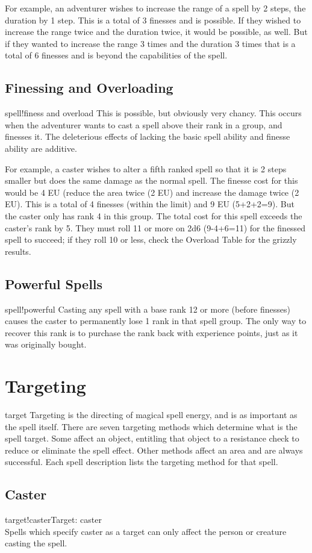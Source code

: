 For example, an adventurer wishes to increase the range of a spell by 2 steps, the duration by 1 step. This is a total of 3 finesses and is possible. If they wished to increase the range twice and the duration twice, it would be possible, as well. But if they wanted to increase the range 3 times and the duration 3 times that is a total of 6 finesses and is beyond the capabilities of the spell.
\subsection{Finessing and Overloading}
spell!finess and overload
This is possible, but obviously very chancy. This occurs when the adventurer wants to cast a spell above their rank in a group, and finesses it. The deleterious effects of lacking the basic spell ability and finesse ability are additive.

For example, a caster wishes to alter a fifth ranked spell so that it is 2 steps smaller but does the same damage as the normal spell. The finesse cost for this would be 4 EU (reduce the area twice (2 EU) and increase the damage twice (2 EU). This is a total of 4 finesses (within the limit) and 9 EU (5+2+2=9). But the caster only has rank 4 in this group. The total cost for this spell exceeds the caster's rank by 5. They must roll 11 or more on 2d6 (9-4+6=11) for the finessed spell to succeed; if they roll 10 or less, check the Overload Table for the grizzly results.
\subsection{Powerful Spells}
spell!powerful
Casting any spell with a base rank 12 or more (before finesses) causes the caster to permanently lose 1 rank in that spell group. The only way to recover this rank is to purchase the rank back with experience points, just as it was originally bought.
\section{Targeting}
target
Targeting is the directing of magical spell energy, and is as important as the spell itself. There are seven targeting methods which determine what is the spell target. Some affect an object, entitling that object to a resistance check to reduce or eliminate the spell effect. Other methods affect an area and are always successful. Each spell description lists the targeting method for that spell.
\subsection{Caster}
target!casterTarget: caster\\
Spells which specify caster as a target can only
affect the person or creature casting the spell.

